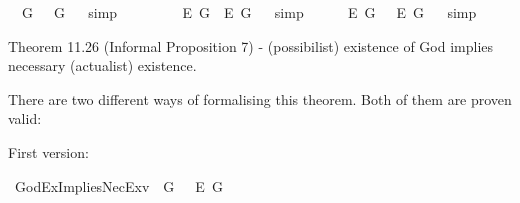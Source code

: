 \begin{isabellebody}
\begin{isamarkuptext}
\end{isamarkuptext}\isamarkuptrue%
\isamarkupfalse%
\ {\isachardoublequoteopen}{\isasymlfloor}\isactrlbold {\isasymexists}\ G\ \isactrlbold {\isasymleftrightarrow}\ \isactrlbold {\isasymexists}\ \isactrlbold {\isasymdown}G{\isasymrfloor}{\isachardoublequoteclose}%
\isadelimproof
\ %
\endisadelimproof
%
\isatagproof
{}\isamarkupfalse%
\ simp%
\endisatagproof
{\isafoldproof}%
%
\isadelimproof
%
\endisadelimproof
\ \ \ \ \ \ \ \isanewline
{}\isamarkupfalse%
\ {\isachardoublequoteopen}{\isasymlfloor}\isactrlbold {\isasymexists}\isactrlsup E\ G\ \isactrlbold {\isasymleftrightarrow}\ \isactrlbold {\isasymexists}\isactrlsup E\ \isactrlbold {\isasymdown}G{\isasymrfloor}{\isachardoublequoteclose}%
\isadelimproof
\ %
\endisadelimproof
%
\isatagproof
{}\isamarkupfalse%
\ simp%
\endisatagproof
{\isafoldproof}%
%
\isadelimproof
%
\endisadelimproof
\ \ \ \ \isanewline
{}\isamarkupfalse%
\ {\isachardoublequoteopen}{\isasymlfloor}\isactrlbold {\isasymbox}\isactrlbold {\isasymexists}\isactrlsup E\ G\ \isactrlbold {\isasymleftrightarrow}\ \ \isactrlbold {\isasymbox}\isactrlbold {\isasymexists}\isactrlsup E\ \isactrlbold {\isasymdown}G{\isasymrfloor}{\isachardoublequoteclose}%
\isadelimproof
\ %
\endisadelimproof
%
\isatagproof
{}\isamarkupfalse%
\ simp%
\endisatagproof
{\isafoldproof}%
%
\isadelimproof
%
\endisadelimproof
%
\begin{isamarkuptext}%
Theorem 11.26 (Informal Proposition 7) - (possibilist) existence of God implies necessary (actualist) existence.%
\end{isamarkuptext}\isamarkuptrue%
%
\begin{isamarkuptext}%
There are two different ways of formalising this theorem. Both of them are proven valid:%
\end{isamarkuptext}\isamarkuptrue%
%
\begin{isamarkuptext}%
First version:%
\end{isamarkuptext}\isamarkuptrue%
\isamarkupfalse%
\ GodExImpliesNecEx{\isacharunderscore}v{}{\isacharcolon}\ {\isachardoublequoteopen}{\isasymlfloor}\isactrlbold {\isasymexists}\ \isactrlbold {\isasymdown}G\ \isactrlbold {\isasymrightarrow}\ \ \isactrlbold {\isasymbox}\isactrlbold {\isasymexists}\isactrlsup E\ \isactrlbold {\isasymdown}G{\isasymrfloor}{\isachardoublequoteclose}\ \isanewline
%
\isadelimproof
%
\endisadelimproof
%
\isatagproof
{}\isamarkupfalse%
\ {\isacharminus}\isanewline

\end{isabellebody}
